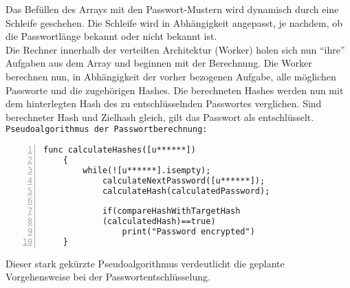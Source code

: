 Das Befüllen des Arrays mit den Passwort-Mustern wird dynamisch durch eine Schleife geschehen. Die Schleife wird in Abhängigkeit angepasst, je nachdem, ob die Passwortlänge bekannt oder nicht bekannt ist. \\
Die Rechner innerhalb der verteilten Architektur (Worker) holen sich nun \enquote{ihre} Aufgaben aus dem Array und beginnen mit der Berechnung. Die Worker berechnen nun, in Abhängigkeit der vorher bezogenen Aufgabe, alle möglichen Passworte und die zugehörigen Hashes. Die berechneten Hashes werden nun mit dem hinterlegten Hash des zu entschlüsselnden Passwortes verglichen. Sind berechneter Hash und Zielhash gleich, gilt das Passwort als entschlüsselt. \\

\texttt{Pseudoalgorithmus der Passwortberechnung:}
\begin{lstlisting}[basicstyle=\ttfamily,numbers=left,numberstyle=\footnotesize\ttfamily,backgroundcolor=\color{sourcegray}]
	func calculateHashes([u******])
	{
		while(![u******].isempty);
			calculateNextPassword([u******]);
			calculateHash(calculatedPassword);
						
			if(compareHashWithTargetHash
			(calculatedHash)==true)
				print("Password encrypted")
	}
\end{lstlisting}

Dieser stark gekürzte Pseudoalgorithmus verdeutlicht die geplante Vorgehensweise bei der Passwortentschlüsselung. \\


